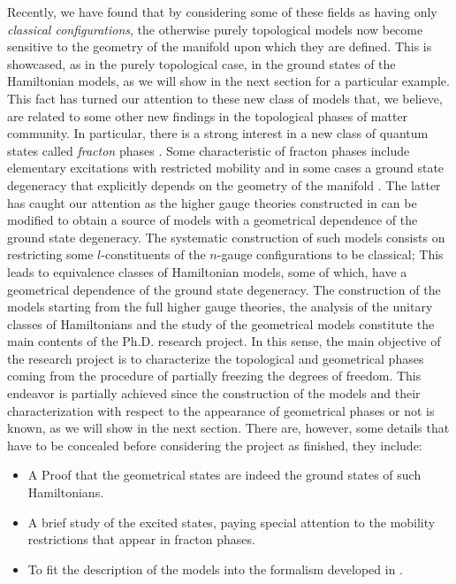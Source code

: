 \documentclass[%
nofootinbib,
 amsmath,amssymb,
aps,
]{revtex4-1}
\theoremstyle{plain}%
\theoremstyle{definition}
\theoremstyle{remark}
\begin{document}
Recently, we have found that by considering some of these fields as having only \emph{classical configurations}, the otherwise purely topological models now become sensitive to the geometry of the manifold upon which they are defined. This is showcased, as in the purely topological case, in the ground states of the Hamiltonian models, as we will show in the next section for a particular example. This fact has turned our attention to these new class of models that, we believe, are related to some other new findings in the topological phases of matter community. In particular, there is a strong interest in a new class of quantum states called \emph{fracton} phases \cite{chamon05,bravyi11,castelnovo12,haah11,bravyi13,yoshida13,vijay15,vijay16,vijay17,shirley17,rahul18}. Some characteristic of fracton phases include elementary excitations with restricted mobility and in some cases a ground state degeneracy that explicitly depends on the geometry of the manifold \cite{slagle17}. The latter has caught our attention as the higher gauge theories constructed in \cite{higher} can be modified to obtain a source of models with a geometrical dependence of the ground state degeneracy. The systematic construction of such models consists on restricting some $l$-constituents of the $n$-gauge configurations to be classical; This leads to equivalence classes of Hamiltonian models, some of which, have a geometrical dependence of the ground state degeneracy.  The construction of the models starting from the full higher gauge theories, the analysis of the unitary classes of Hamiltonians and the study of the geometrical models constitute the main contents of the Ph.D. research project. In this sense, the main objective of the research project is to characterize the topological and geometrical phases coming from the procedure of partially freezing the degrees of freedom. This endeavor is partially achieved since the construction of the models and their characterization with respect to the appearance of geometrical phases or not is known, as we will show in the next section. There are, however, some details that have to be concealed before considering the project as finished, they include:
\begin{itemize}
\item A Proof that the geometrical states are indeed the ground states of such Hamiltonians.
\item A brief study of the excited states, paying special attention to the mobility restrictions that appear in fracton phases.
\item To fit the description of the models into the formalism developed in \cite{higher}.
\end{itemize}
\end{document}

